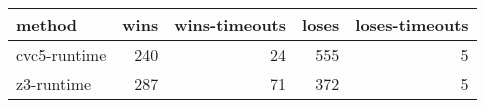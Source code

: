 \begin{tabular}{lrrrr}
\hline
 method       &   wins &   wins-timeouts &   loses &   loses-timeouts \\
\hline
 cvc5-runtime &    240 &              24 &     555 &                5 \\
 z3-runtime   &    287 &              71 &     372 &                5 \\
\hline
\end{tabular}
